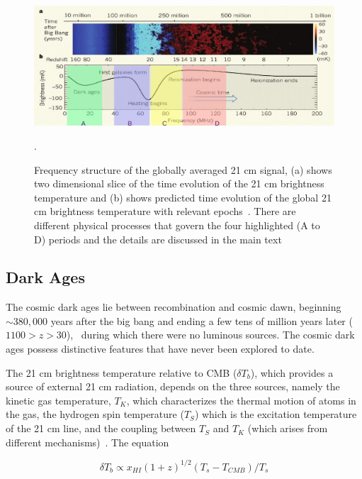 	\begin{figure}
		\begin{center}
			\includegraphics[width=\linewidth]{Figures/epo.pdf}\\
			\caption{Frequency structure of the globally averaged 21 cm signal, (a) shows two dimensional slice of the time evolution of the 21 cm brightness temperature and (b) shows predicted time evolution of the global 21 cm brightness temperature with relevant epochs~\citep{2012RPPh...75h6901P}. There are different physical processes that govern the four highlighted (A to D) periods and the details are discussed in the main text}.
			\label{Fig:epochs}
		\end{center}
	\end{figure}
	
	\subsection{Dark Ages}
	
	The cosmic dark ages lie between recombination and cosmic dawn, beginning $\sim380,000$ years after the big bang and ending a few tens of million years later ($1100 > z > 30$),~\citep{2014arXiv1412.2096J} during which there were no luminous sources. The cosmic dark ages possess distinctive features that have never been explored to date. 
	
	
	The 21 cm brightness temperature relative to CMB ($\delta$$T_b$), which provides a source of external 21 cm radiation, depends on the three sources, namely the kinetic gas temperature, $T_K$, which characterizes the thermal motion of atoms in the gas, the hydrogen spin temperature ($T_S$) which is the excitation temperature of the 21 cm line, and the coupling between $T_S$ and $T_K$ (which arises from different mechanisms)~\citep{2015aska.confE...1K,2006PhR...433..181F}. The equation  
	
	\begin{equation}
	\delta{T_b}\propto {x_{HI}}(1+z)^{1/2}({T_s}-{T_{CMB}})/{T_s}
	\end{equation}
	
